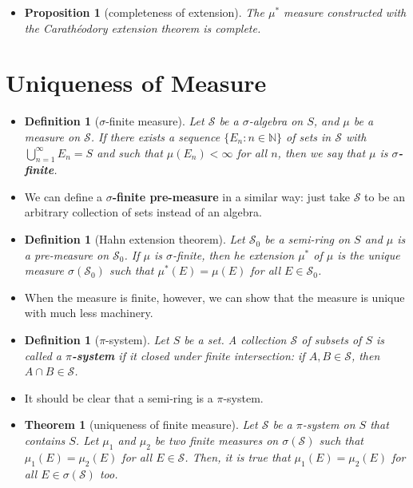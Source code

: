 \documentclass[10pt]{article}
\newtheorem{theorem}[lemma]{Theorem}
\newtheorem{definition}[lemma]{Definition}
\newtheorem{proposition}[lemma]{Proposition}
\numberwithin{lemma}{section}
\newcommand{\mcal}[1]{\mathcal{#1}}
\newcommand{\Nat}{\mathbb{N}}
\begin{document}
\begin{itemize}
  \item \begin{proposition}[completeness of extension]
    The $\mu^*$ measure constructed with the Carath\'{e}odory extension theorem is complete.
  \end{proposition}
\end{itemize}

\section{Uniqueness of Measure}

\begin{itemize}
  \item \begin{definition}[$\sigma$-finite measure]
    Let $\mcal{S}$ be a $\sigma$-algebra on $S$, and $\mu$ be a measure on $\mcal{S}$. If there exists a sequence $\{E_n : n \in \Nat \}$ of sets in $\mcal{S}$ with $\bigcup_{n=1}^\infty E_n = S$ and such that $\mu(E_n) < \infty$ for all $n$, then we say that $\mu$ is {\bf $\sigma$-finite}.
  \end{definition}

  \item We can define a {\bf $\sigma$-finite pre-measure} in a similar way: just take $\mcal{S}$ to be an arbitrary collection of sets instead of an algebra.

  \item \begin{definition}[Hahn extension theorem]
    Let $\mcal{S}_0$ be a semi-ring on $S$ and $\mu$ is a pre-measure on $\mcal{S}_0$. If $\mu$ is $\sigma$-finite, then he extension $\mu^*$ of $\mu$ is the unique measure $\sigma(\mcal{S}_0)$ such that $\mu^*(E) = \mu(E)$ for all $E \in \mcal{S}_0$.
  \end{definition}

  \item When the measure is finite, however, we can show that the measure is unique with much less machinery.
  
  \item \begin{definition}[$\pi$-system]
    Let $S$ be a set. A collection $\mcal{S}$ of subsets of $S$ is called a {\bf $\pi$-system} if it closed under finite intersection: if $A, B \in \mcal{S}$, then $A \cap B \in \mcal{S}$.
  \end{definition}

  \item It should be clear that a semi-ring is a $\pi$-system.
  
  \item \begin{theorem}[uniqueness of finite measure]
    Let $\mcal{S}$ be a $\pi$-system on $S$ that contains $S$. Let $\mu_1$ and $\mu_2$ be two finite measures on $\sigma(\mcal{S})$ such that $\mu_1(E) = \mu_2(E)$ for all $E \in \mcal{S}$. Then, it is true that $\mu_1(E) = \mu_2(E)$ for all $E \in \sigma(\mcal{S})$ too.
  \end{theorem}
\end{itemize}
\end{document}
